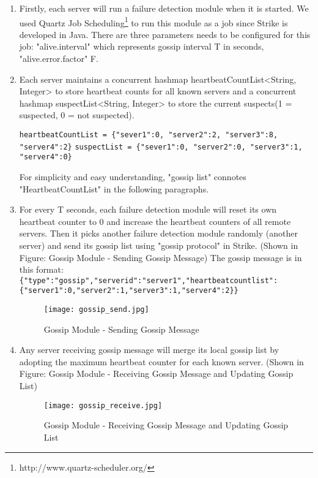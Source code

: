 \documentclass[dareport.tex]{subfiles}
\begin{document}
\begin{enumerate}[leftmargin=*]
\item Firstly, each server will run a failure detection module when it is started. We used Quartz Job Scheduling\footnote{http://www.quartz-scheduler.org/} to run this module as a job since Strike is developed in Java. There are three parameters needs to be configured for this job: "alive.interval" which represents gossip interval T in seconds, "alive.error.factor" F. 

\item Each server maintains a concurrent hashmap heartbeatCountList<String, Integer> to store heartbeat counts for all known servers and a concurrent hashmap suspectList<String, Integer> to store the current suspects(1 = suspected, 0 = not suspected).

\verb|heartbeatCountList = {"sever1":0, "server2":2, "server3":8, "server4":2}|
\verb|suspectList = {"sever1":0, "server2":0, "server3":1, "server4":0}|

For simplicity and easy understanding, "gossip list" connotes "HeartbeatCountList" in the following paragraphs.

\item For every T seconds, each failure detection module will reset its own heartbeat counter to 0 and increase the heartbeat counters of all remote servers. Then it picks another failure detection module randomly (another server) and send its gossip list using "gossip protocol" in Strike. (Shown in Figure: Gossip Module - Sending Gossip Message) The gossip message is in this format:
\verb|{"type":"gossip","serverid":"server1","heartbeatcountlist":{"server1":0,"server2":1,"server3":1,"server4":2}}|

\begin{figure}[h]
\label{fig:Gossip Module - Sending Gossip Message}
\texttt{[image: gossip\_send.jpg]}
\caption{Gossip Module - Sending Gossip Message}
\centering
\end{figure}

\item Any server receiving gossip message will merge its local gossip list by adopting the maximum heartbeat counter for each known server. (Shown in Figure: Gossip Module - Receiving Gossip Message and Updating Gossip List)

\begin{figure}[h]
\label{fig:Gossip Module - Receiving Gossip Message and Updating Gossip List}
\texttt{[image: gossip\_receive.jpg]}
\caption{Gossip Module - Receiving Gossip Message and Updating Gossip List}
\centering
\end{figure}



\end{enumerate}
\end{document}
